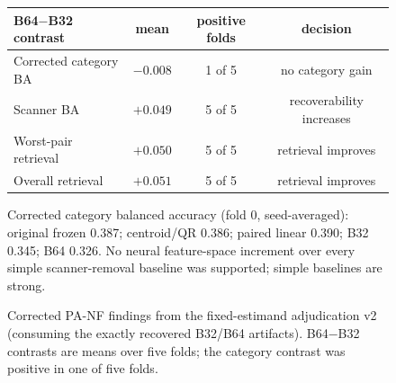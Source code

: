 \begin{figure}[!htbp]
\centering
\caption{Corrected PA-NF findings from the fixed-estimand adjudication v2
(consuming the exactly recovered B32/B64 artifacts). B64$-$B32 contrasts are
means over five folds; the category contrast was positive in one of five
folds.}
\label{fig:panf_findings}
{\footnotesize
\setlength{\tabcolsep}{4pt}
\begin{tabular}{@{}lccc@{}}
\toprule
B64$-$B32 contrast & mean & positive folds & decision \\
\midrule
Corrected category BA & $-0.008$ & 1 of 5 & no category gain \\
Scanner BA & $+0.049$ & 5 of 5 & recoverability increases \\
Worst-pair retrieval & $+0.050$ & 5 of 5 & retrieval improves \\
Overall retrieval & $+0.051$ & 5 of 5 & retrieval improves \\
\bottomrule
\end{tabular}
}

\smallskip
\begin{minipage}{0.88\linewidth}
\footnotesize
Corrected category balanced accuracy (fold 0, seed-averaged): original frozen
0.387; centroid/QR 0.386; paired linear 0.390; B32 0.345; B64 0.326.
No neural feature-space increment over every simple scanner-removal baseline
was supported; simple baselines are strong.
\end{minipage}
\end{figure}
